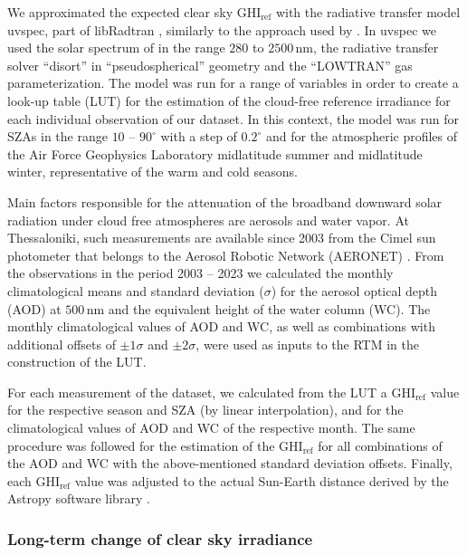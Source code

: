 \documentclass[preprint, 5p,
authoryear]{elsarticle} %
\begin{document}
We approximated the expected clear sky \(\text{GHI}_\text{ref}\) with
the radiative transfer model uvspec, part of libRadtran
\citep{Emde2016}, similarly to the approach used by
\citet{Vamvakas2020}. In uvspec we used the solar spectrum of
\citet{Kurucz1994} in the range \(280\) to \(2500\,\text{nm}\), the
radiative transfer solver ``disort'' in ``pseudospherical'' geometry and
the ``LOWTRAN'' gas parameterization. The model was run for a range of
variables in order to create a look-up table (LUT) for the estimation of
the cloud-free reference irradiance for each individual observation of
our dataset. In this context, the model was run for SZAs in the range
\(10\) -- \(90^\circ\) with a step of \(0.2^\circ\) and for the
atmospheric profiles of the Air Force Geophysics Laboratory
\citep{Anderson1986} midlatitude summer and midlatitude winter,
representative of the warm and cold seasons.

Main factors responsible for the attenuation of the broadband downward
solar radiation under cloud free atmospheres are aerosols and water
vapor. At Thessaloniki, such measurements are available since 2003 from
the Cimel sun photometer that belongs to the Aerosol Robotic Network
(AERONET) \citep{Giles2019, Buis1998}. From the observations in the
period 2003 -- 2023 we calculated the monthly climatological means and
standard deviation (\(\sigma\)) for the aerosol optical depth (AOD) at
\(500\,\text{nm}\) and the equivalent height of the water column (WC).
The monthly climatological values of AOD and WC, as well as combinations
with additional offsets of \(\pm1\sigma\) and \(\pm2\sigma\), were used
as inputs to the RTM in the construction of the LUT.

For each measurement of the dataset, we calculated from the LUT a
\(\text{GHI}_\text{ref}\) value for the respective season and SZA (by
linear interpolation), and for the climatological values of AOD and WC
of the respective month. The same procedure was followed for the
estimation of the \(\text{GHI}_\text{ref}\) for all combinations of the
AOD and WC with the above-mentioned standard deviation offsets. Finally,
each \(\text{GHI}_\text{ref}\) value was adjusted to the actual
Sun-Earth distance derived by the Astropy software library
\citep{AstropyCollaboration2022}.

\hypertarget{long-term-change-of-clear-sky-irradiance}{%
\subsubsection{Long-term change of clear sky
irradiance}\label{long-term-change-of-clear-sky-irradiance}}
\end{document}
